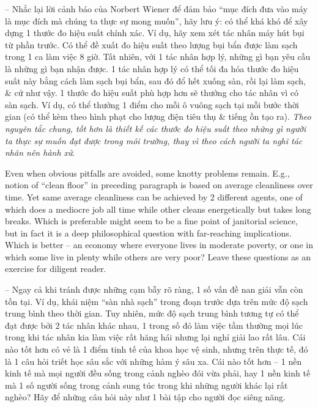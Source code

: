 \documentclass{article}
\begin{document}
\begin{itemize}
\begin{itemize}
\begin{itemize}
\begin{itemize}
				-- Nhắc lại lời cảnh báo của {\sc Norbert Wiener} để đảm bảo ``mục đích đưa vào máy là mục đích mà chúng ta thực sự mong muốn'', hãy lưu ý: có thể khá khó để xây dựng 1 thước đo hiệu suất chính xác. Ví dụ, hãy xem xét tác nhân máy hút bụi từ phần trước. Có thể đề xuất đo hiệu suất theo lượng bụi bẩn được làm sạch trong 1 ca làm việc 8 giờ. Tất nhiên, với 1 tác nhân hợp lý, những gì bạn yêu cầu là những gì bạn nhận được. 1 tác nhân hợp lý có thể tối đa hóa thước đo hiệu suất này bằng cách làm sạch bụi bẩn, sau đó đổ hết xuống sàn, rồi lại làm sạch, \& cứ như vậy. 1 thước đo hiệu suất phù hợp hơn sẽ thưởng cho tác nhân vì có sàn sạch. Ví dụ, có thể thưởng 1 điểm cho mỗi ô vuông sạch tại mỗi bước thời gian (có thể kèm theo hình phạt cho lượng điện tiêu thụ \& tiếng ồn tạo ra). {\it Theo nguyên tắc chung, tốt hơn là thiết kế các thước đo hiệu suất theo những gì người ta thực sự muốn đạt được trong môi trường, thay vì theo cách người ta nghĩ tác nhân nên hành xử}.

				Even when obvious pitfalls are avoided, some knotty problems remain. E.g., notion of ``clean floor'' in preceding paragraph is based on average cleanliness over time. Yet same average cleanliness can be achieved by 2 different agents, one of which does a mediocre job all time while other cleans energetically but takes long breaks. Which is preferable might seem to be a fine point of janitorial science, but in fact it is a deep philosophical question with far-reaching implications. Which is better -- an economy where everyone lives in moderate poverty, or one in which some live in plenty while others are very poor? Leave these questions as an exercise for diligent reader.

				-- Ngay cả khi tránh được những cạm bẫy rõ ràng, 1 số vấn đề nan giải vẫn còn tồn tại. Ví dụ, khái niệm ``sàn nhà sạch'' trong đoạn trước dựa trên mức độ sạch trung bình theo thời gian. Tuy nhiên, mức độ sạch trung bình tương tự có thể đạt được bởi 2 tác nhân khác nhau, 1 trong số đó làm việc tầm thường mọi lúc trong khi tác nhân kia làm việc rất hăng hái nhưng lại nghỉ giải lao rất lâu. Cái nào tốt hơn có vẻ là 1 điểm tinh tế của khoa học vệ sinh, nhưng trên thực tế, đó là 1 câu hỏi triết học sâu sắc với những hàm ý sâu xa. Cái nào tốt hơn -- 1 nền kinh tế mà mọi người đều sống trong cảnh nghèo đói vừa phải, hay 1 nền kinh tế mà 1 số người sống trong cảnh sung túc trong khi những người khác lại rất nghèo? Hãy để những câu hỏi này như 1 bài tập cho người đọc siêng năng.


\end{itemize}
\end{itemize}
\end{itemize}
\end{itemize}
\end{document}
